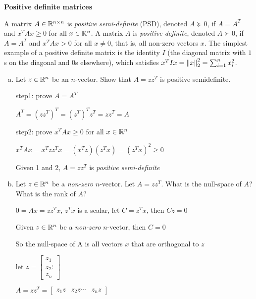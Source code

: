 
\item {} \textbf{Positive definite matrices}

  A matrix $A \in \mathbb{R}^{n \times n}$ is \emph{positive semi-definite}
  (PSD), denoted $A \succeq 0$, if
  $A = A^T$ and $x^T A x \ge 0$ for all $x \in \mathbb{R}^n$.
  A matrix $A$ is \emph{positive definite}, denoted $A \succ 0$,
  if $A = A^T$ and $x^T A x > 0$ for all $x \neq 0$, that is,
  all non-zero vectors $x$. The simplest example of a positive
  definite matrix is the identity  $I$ (the diagonal matrix with $1$s on
  the diagonal and $0$s elsewhere), which satisfies
  $x^T I x = \left\|{x}\right\|_2^2 = \sum_{i = 1}^n x_i^2$.
  \begin{enumerate}[(a)]
  \item Let $z \in \mathbb{R}^n$ be an $n$-vector.
    Show that $A = zz^T$ is positive semidefinite.

    step1: prove  $A = A^T$

    $A^T = (zz^T)^T = (z^T)^T z^T = z z^T = A$

    step2: prove $x^T A x \ge 0$ for all $x \in \mathbb{R}^n$
    
    $x^T A x = x^T z z^T x = (x^T z) (z^T x) = (z^T x) ^ 2 \ge 0$

    Given 1 and 2, $A = z z^T$ is \emph{positive semi-definite}

  \item Let $z \in \mathbb{R}^n$ be a \emph{non-zero} $n$-vector.
    Let $A = zz^T$. What is the null-space of $A$?
    What is the rank of $A$?

    $0 = A x = z z^T x$, $z^T x$ is a scalar, let $C = z^T x$, then $Cz = 0$

    Given $z \in \mathbb{R}^n$ be a \emph{non-zero} $n$-vector, then $C = 0$ 

    So the null-space of A is all vectors $x$ that are orthogonal to $z$

    let $z = \left[\begin{matrix} z_1 \\ z_2 \vdots \\ z_n \end{matrix}\right]$
    
    $A = z z^T = \left[\begin{matrix}
        z_1 z & z_2 z \cdots & z_n z \end{matrix} \right]$


\end{enumerate}
